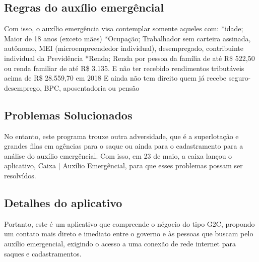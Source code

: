 \documentclass[12pt]{article}
\begin{document}
\subsection{Regras do auxílio emergêncial}	
Com isso, o auxílio emergência visa contemplar somente aqueles com:
\linebreak
\linebreak
*idade; Maior de 18 anos (exceto mães)
\linebreak
\linebreak
*Ocupação; Trabalhador sem carteira assinada, autônomo, MEI (microempreendedor individual), desempregado, contribuinte individual da Previdência 
\linebreak
\linebreak
*Renda; Renda por pessoa da família de até R\$ 522,50 ou renda familiar de até R\$ 3.135. E não ter recebido rendimentos tributáveis acima de R\$ 28.559,70 em 2018
\linebreak
\linebreak
E ainda não tem direito quem já recebe seguro-desemprego, BPC, aposentadoria ou pensão
\linebreak
\linebreak
\subsection{Problemas Solucionados}
	No entanto, este programa trouxe outra adversidade, que é a superlotação e grandes filas em agências para o saque ou ainda para o cadastramento para a análise do auxílio emergêncial. Com isso, em 23 de maio, a caixa lançou o aplicativo, Caixa | Auxílio Emergêncial, para que esses problemas possam ser resolvídos.

\subsection{Detalhes do aplicativo}
	Portanto, este é um aplicativo que compreende o négocio do tipo G2C, propondo um contato mais direto e imediato entre o governo e às pessoas que buscam pelo auxílio emergencial, exigindo o acesso a uma conexão de rede internet para saques e cadastramentos.
\end{document}
